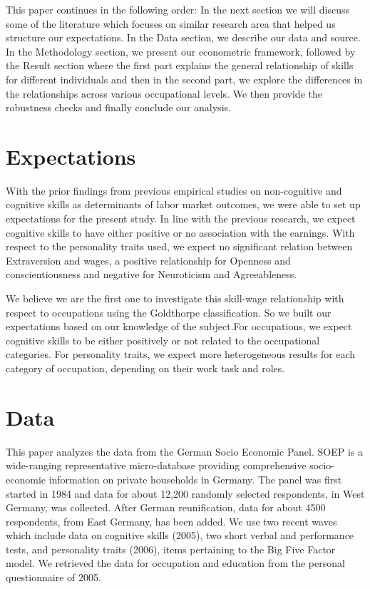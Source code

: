 \documentclass[11pt, a4paper, leqno]{article}
\begin{document}
This paper continues in the following order: In the next section we will discuss some of the literature which focuses on similar research area that helped us structure our expectations. In the Data section, we describe our data and source. In the Methodology section, we present our econometric framework, followed by the Result section where the first part explains the general relationship of skills for different individuals and then in the second part, we explore the differences in the relationships across various occupational levels. We then provide the robustness checks and finally conclude our analysis.

\section*{Expectations}

With the prior findings from previous empirical studies on non-cognitive and cognitive skills as determinants of labor market outcomes, we were able to set up expectations for the present study. 
In line with the previous research, we expect cognitive skills to have either positive or no association with the earnings. With respect to the personality traits used, we expect no significant relation between Extraversion and wages, a positive relationship for Openness and conscientiousness and negative for Neuroticism and Agreeableness.\par

We believe we are the first one to investigate this skill-wage relationship with respect to occupations using the Goldthorpe classification. So we built our expectations based on our knowledge of the subject.For occupations, we expect cognitive skills to be either positively or not related to the occupational categories. For personality traits, we expect more heterogeneous results for each category of occupation, depending on their work task and roles.


\section*{Data}

This paper analyzes the data from the German Socio Economic Panel. SOEP is a wide-ranging representative micro-database providing comprehensive socio-economic information on private households in Germany. The panel was first started in 1984 and data for about 12,200 randomly selected respondents, in West Germany, was collected. After German reunification, data for about 4500 respondents, from East Germany, has been added. We use two recent waves which include data on cognitive skills (2005), two short verbal and performance tests, and personality traits (2006), items pertaining to the Big Five Factor model. We retrieved the data for occupation and education from the personal questionnaire of 2005. 
\end{document}
